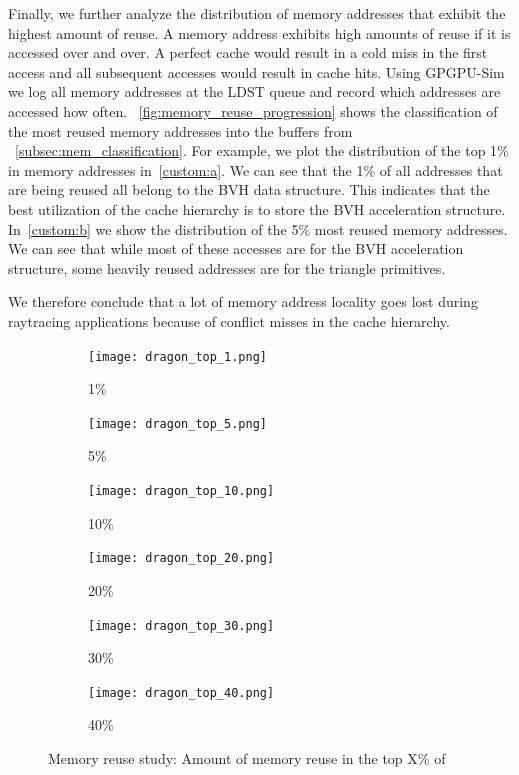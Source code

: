 Finally, we further analyze the distribution of memory addresses that exhibit the highest amount of reuse. A memory address exhibits high amounts of reuse if it is accessed over and over. A perfect cache would result in a cold miss in the first access and all subsequent accesses would result in cache hits.
Using GPGPU-Sim we log all memory addresses at the LDST queue and record which addresses are accessed how often. 
~\autoref{fig:memory_reuse_progression} shows the classification of the most reused memory addresses into the buffers from ~\autoref{subsec:mem_classification}. For example, we plot the distribution of the top 1\% in memory addresses in~\autoref{custom:a}. We can see that the 1\% of all addresses that are being reused all belong to the BVH data structure. This indicates that the best utilization of the cache hierarchy is to store the BVH acceleration structure. In~\autoref{custom:b} we show the distribution of the 5\% most reused memory addresses. We can see that while most of these accesses are for the BVH acceleration structure, some heavily reused addresses are for the triangle primitives. 

We therefore conclude that a lot of memory address locality goes lost during raytracing applications because of conflict misses in the cache hierarchy. 

\begin{figure}[htb]
  \begin{subfigure}{0.49\textwidth}
  \texttt{[image: dragon\_top\_1.png]}
  \caption{\label{custom:a}1\%}
  \end{subfigure}
  \hspace*{\fill} %
  \begin{subfigure}{0.49\textwidth}
  \texttt{[image: dragon\_top\_5.png]}
  \caption{\label{custom:b}5\%}
  \end{subfigure}
  \qquad
  \begin{subfigure}{0.49\textwidth}
  \texttt{[image: dragon\_top\_10.png]}
  \caption{10\%}
  \end{subfigure}
  \hspace*{\fill} %
   \begin{subfigure}{0.49\textwidth}
  \texttt{[image: dragon\_top\_20.png]}
  \caption{20\%}
  \end{subfigure}
  \qquad
  \begin{subfigure}{0.49\textwidth}
  \texttt{[image: dragon\_top\_30.png]}
  \caption{30\%}
  \end{subfigure}
  \hspace*{\fill} %
  \begin{subfigure}{0.49\textwidth}
  \texttt{[image: dragon\_top\_40.png]}
  \caption{40\%}
  \label{subfig:san_mig_ao}
  \end{subfigure}
  
  \caption{\label{fig:memory_reuse_progression}
           Memory reuse study: Amount of memory reuse in the top X\% of
           }
\end{figure}